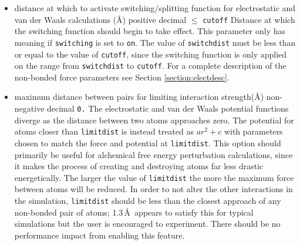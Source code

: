 \begin{itemize}

\item
{}
{distance at which to activate switching/splitting function 
for electrostatic and van der Waals calculations (\AA)}
{positive decimal $\leq$ {\tt cutoff}}
{Distance at which the switching function
should begin to take effect.  
This parameter only has meaning if {\tt switching} is 
set to {\tt on}.  
The value of {\tt switchdist} must be less than
or equal to the value of {\tt cutoff}, since the switching function
is only applied on the range from {\tt switchdist} to {\tt cutoff}.  
For a complete description of the non-bonded force parameters see
Section \ref{section:electdesc}.}

\item
{}
{maximum distance between pairs for limiting interaction strength(\AA)}
{non-negative decimal}
{{\tt 0.}}
{
The electrostatic and van der Waals potential functions diverge
as the distance between two atoms approaches zero.
The potential for atoms closer than {\tt limitdist} is instead
treated as $a r^2 + c$ with parameters chosen to match the
force and potential at {\tt limitdist}.
This option should primarily be useful for alchemical free energy
perturbation calculations, since it makes the process of creating
and destroying atoms far less drastic energetically.
The larger the value of {\tt limitdist} the more the maximum force
between atoms will be reduced.
In order to not alter the other interactions in the simulation,
{\tt limitdist} should be less than the closest approach
of any non-bonded pair of atoms; 1.3\,\AA\ appears to satisfy this
for typical simulations but the user is encouraged to experiment.
There should be no performance impact from enabling this feature.
}


\end{itemize}
